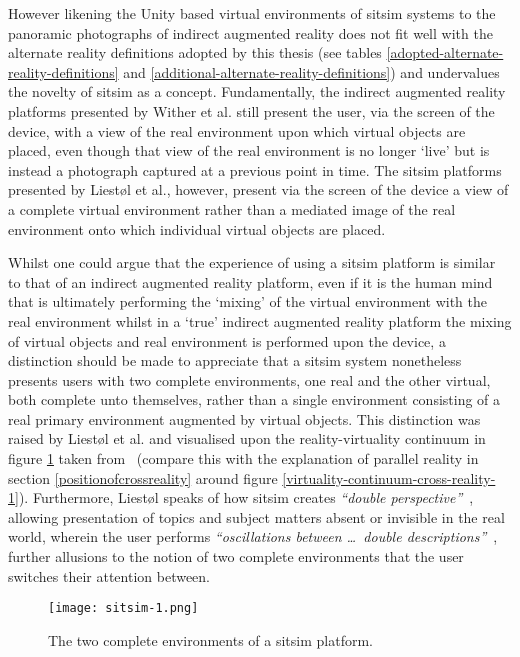 However likening the Unity based virtual environments of sitsim systems to the panoramic photographs of indirect augmented reality does not fit well with the alternate reality definitions adopted by this thesis (see tables \ref{adopted-alternate-reality-definitions} and \ref{additional-alternate-reality-definitions}) and undervalues the novelty of sitsim as a concept. Fundamentally, the indirect augmented reality platforms presented by Wither et al. still present the user, via the screen of the device, with a view of the real environment upon which virtual objects are placed, even though that view of the real environment is no longer `live' but is instead a photograph captured at a previous point in time. The sitsim platforms presented by Liest\o l et al., however, present via the screen of the device a view of a complete virtual environment rather than a mediated image of the real environment onto which individual virtual objects are placed.

Whilst one could argue that the experience of using a sitsim platform is similar to that of an indirect augmented reality platform, even if it is the human mind that is ultimately performing the `mixing' of the virtual environment with the real environment whilst in a `true' indirect augmented reality platform the mixing of virtual objects and real environment is performed upon the device, a distinction should be made to appreciate that a sitsim system nonetheless presents users with two complete environments, one real and the other virtual, both complete unto themselves, rather than a single environment consisting of a real primary environment augmented by virtual objects. This distinction was raised by Liest\o l et al. and visualised upon the reality-virtuality continuum in figure \ref{sitsim-1.png} taken from~\cite{Liestøl2011} (compare this with the explanation of parallel reality in section \ref{positionofcrossreality} around figure \ref{virtuality-continuum-cross-reality-1}). Furthermore, Liest\o l speaks of how sitsim creates \textit{``double perspective''}~\cite{Liestøl2009}, allowing presentation of topics and subject matters absent or invisible in the real world, wherein the user performs \textit{``oscillations between \ldots\ double descriptions''}~\cite{Liestøl2014}, further allusions to the notion of two complete environments that the user switches their attention between.

\begin{figure}[h]
\centering
  \texttt{[image: sitsim-1.png]}
  \caption{The two complete environments of a sitsim platform.}
  \label{sitsim-1.png}
\end{figure}

